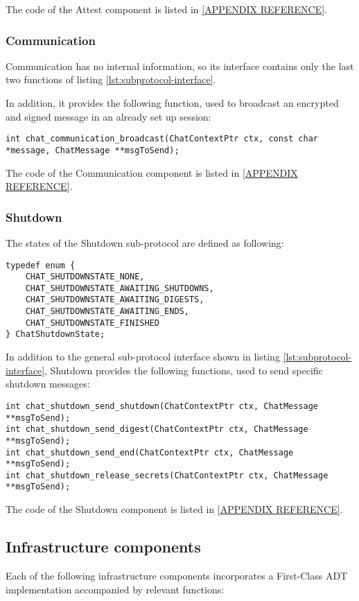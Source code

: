 The code of the Attest component is listed in \ref{APPENDIX REFERENCE}.


\subsubsection{Communication}
Communication has no internal information, so its interface contains only the last two functions of listing \ref{lst:subprotocol-interface}.

In addition, it provides the following function, used to broadcast an encrypted and signed message in an already set up session:
\begin{lstlisting}[caption={Communication specific interface}]
int chat_communication_broadcast(ChatContextPtr ctx, const char *message, ChatMessage **msgToSend);
\end{lstlisting}

The code of the Communication component is listed in \ref{APPENDIX REFERENCE}.

\subsubsection{Shutdown}
The states of the Shutdown sub-protocol are defined as following:
\begin{lstlisting}[caption={Shutdown states}]
typedef enum {
	CHAT_SHUTDOWNSTATE_NONE,
	CHAT_SHUTDOWNSTATE_AWAITING_SHUTDOWNS,
	CHAT_SHUTDOWNSTATE_AWAITING_DIGESTS,
	CHAT_SHUTDOWNSTATE_AWAITING_ENDS,
	CHAT_SHUTDOWNSTATE_FINISHED
} ChatShutdownState;
\end{lstlisting}

In addition to the general sub-protocol interface shown in listing \ref{lst:subprotocol-interface}, Shutdown provides the following functions, used to send specific shutdown messages:
\begin{lstlisting}[caption={Shutdown specific interface}]
int chat_shutdown_send_shutdown(ChatContextPtr ctx, ChatMessage **msgToSend);
int chat_shutdown_send_digest(ChatContextPtr ctx, ChatMessage **msgToSend);
int chat_shutdown_send_end(ChatContextPtr ctx, ChatMessage **msgToSend);
int chat_shutdown_release_secrets(ChatContextPtr ctx, ChatMessage **msgToSend);
\end{lstlisting}

The code of the Shutdown component is listed in \ref{APPENDIX REFERENCE}.

\subsection{Infrastructure components}
\label{section:infrastructure-components}
Each of the following infrastructure components incorporates a First-Class ADT implementation accompanied by relevant functions:

